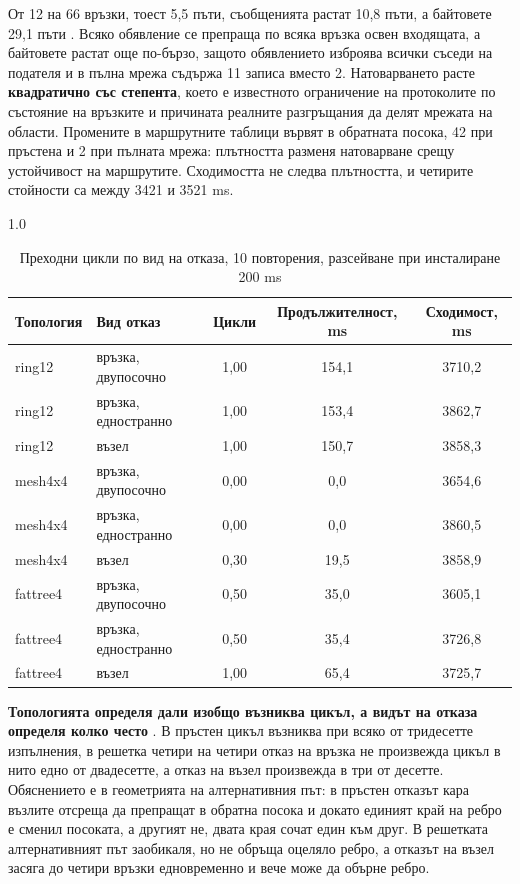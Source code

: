 От 12 на 66 връзки, тоест 5,5 пъти, съобщенията растат 10,8 пъти, а байтовете 29,1 пъти
. Всяко обявление се препраща по всяка връзка освен входящата, а байтовете
растат още по-бързо, защото обявлението изброява всички съседи на подателя и в пълна мрежа
съдържа 11 записа вместо 2. Натоварването расте \textbf{квадратично със степента}, което е
известното ограничение на протоколите по състояние на връзките и причината реалните разгръщания
да делят мрежата на области. Промените в маршрутните таблици вървят в обратната посока, 42 при
пръстена и 2 при пълната мрежа: плътността разменя натоварване срещу устойчивост на маршрутите.
Сходимостта не следва плътността, и четирите стойности са между 3421 и 3521 ms.

\begin{table}[!htb]
\caption{Преходни цикли по вид на отказа, 10 повторения, разсейване при инсталиране 200 ms}
\label{tab:loops}
\centering
\fontsize{10}{12}\selectfont
\begin{spacing}{1.0}
\begin{tabular}{llccc}
\toprule
Топология & Вид отказ & Цикли & Продължителност, ms & Сходимост, ms \\
\midrule
ring12   & връзка, двупосочно & 1,00 & 154,1 & 3710,2 \\
ring12   & връзка, едностранно & 1,00 & 153,4 & 3862,7 \\
ring12   & възел & 1,00 & 150,7 & 3858,3 \\
mesh4x4  & връзка, двупосочно & 0,00 & 0,0 & 3654,6 \\
mesh4x4  & връзка, едностранно & 0,00 & 0,0 & 3860,5 \\
mesh4x4  & възел & 0,30 & 19,5 & 3858,9 \\
fattree4 & връзка, двупосочно & 0,50 & 35,0 & 3605,1 \\
fattree4 & връзка, едностранно & 0,50 & 35,4 & 3726,8 \\
fattree4 & възел & 1,00 & 65,4 & 3725,7 \\
\bottomrule
\end{tabular}
\end{spacing}
\end{table}

\textbf{Топологията определя дали изобщо възниква цикъл, а видът на отказа определя колко
често} . В пръстен цикъл възниква при всяко от тридесетте изпълнения, в
решетка четири на четири отказ на връзка не произвежда цикъл в нито едно от двадесетте, а
отказ на възел произвежда в три от десетте. Обяснението е в геометрията на алтернативния път: в
пръстен отказът кара възлите отсреща да препращат в обратна посока и докато единият край на
ребро е сменил посоката, а другият не, двата края сочат един към друг. В решетката
алтернативният път заобикаля, но не обръща оцеляло ребро, а отказът на възел засяга до четири
връзки едновременно и вече може да обърне ребро.


